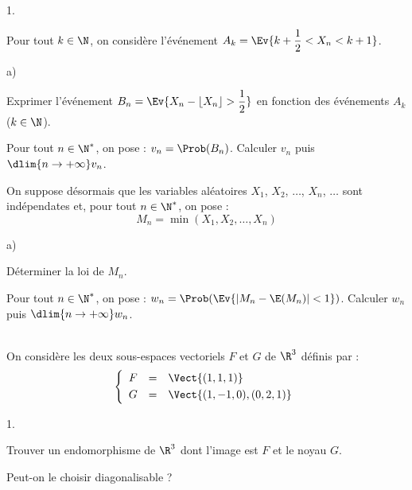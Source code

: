 \documentclass[11pt]{article}%
\begin{document}
\begin{exerciceAP}
\begin{noliste}{1.}
    \item Pour tout $k\in \N$, on considère l'événement 
    $A_k = \Ev{k + \dfrac{1}{2} < X_n < k+1}$.
    \begin{noliste}{a)}
    \setlength{\itemsep}{2mm}
      \item Exprimer l'événement $B_n = \Ev{X_n - \lfloor X_n \rfloor 
      > \dfrac{1}{2}}$ en fonction des événements $A_k$ ($k\in \N$).
      
      \item Pour tout $n\in \N^*$, on pose : $v_n = \Prob(B_n)$.
      Calculer $v_n$ puis $\dlim{n\to +\infty} v_n$.
    \end{noliste}
    
    \item On suppose désormais que les variables aléatoires $X_1$, 
    $X_2$, $\ldots$, $X_n$, $\ldots$ sont indépendates et, pour 
    tout $n\in\N^*$, on pose :
    \[
      M_n = \min(X_1, X_2, \ldots, X_n)
    \]
    \begin{noliste}{a)}
    \setlength{\itemsep}{2mm}
      \item Déterminer la loi de $M_n$.
      
      \item Pour tout $n\in\N^*$, on pose : $w_n = \Prob(\Ev{\vert 
      M_n - \E(M_n) \vert <1})$. Calculer $w_n$ puis $\dlim{n\to 
      +\infty} w_n$.
    \end{noliste}
  \end{noliste}
\end{exerciceAP}




\begin{exerciceSP}~\\
  On considère les deux sous-espaces vectoriels $F$ et $G$ de $\R^3$
  définis par :
  \[
    \left\{
    \begin{array}{rcl}
      F & = & \Vect{(1,1,1)}\\[.1cm]
      G & = & \Vect{(1,-1,0),(0,2,1)}
    \end{array}
    \right.
  \]
  \begin{noliste}{1.}
    \setlength{\itemsep}{2mm}
    \item Trouver un endomorphisme de $\R^3$ dont l'image est $F$
    et le noyau $G$.
    
    \item Peut-on le choisir diagonalisable ?
  \end{noliste}
\end{exerciceSP}
\end{document}
